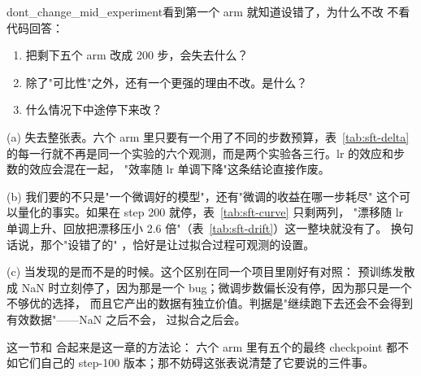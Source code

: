 \begin{checkpoint}{dont_change_mid_experiment}{看到第一个 arm 就知道设错了，为什么不改}
不看代码回答：
\begin{enumerate}[label=(\alph*)]
  \item 把剩下五个 arm 改成 200 步，会失去什么？
  \item 除了"可比性"之外，还有一个更强的理由不改。是什么？
  \item 什么情况下中途停下来改？
\end{enumerate}

\ifshowanswers
\tcblower
\answer (a) 失去整张表。六个 arm 里只要有一个用了不同的步数预算，表~\ref{tab:sft-delta}
的每一行就不再是同一个实验的六个观测，而是两个实验各三行。lr 的效应和步数的效应会混在一起，
"效率随 lr 单调下降"这条结论直接作废。

(b)  我们要的不只是"一个微调好的模型"，还有"微调的收益在哪一步耗尽"
这个可以量化的事实。如果在 step 200 就停，表~\ref{tab:sft-curve} 只剩两列，
"漂移随 lr 单调上升、回放把漂移压小 2.6 倍"（表~\ref{tab:sft-drift}）这一整块就没有了。
换句话说，那个"设错了的" ，恰好是让过拟合过程可观测的设置。

(c) 当发现的是而不是的时候。这个区别在同一个项目里刚好有对照：
预训练发散成 NaN 时立刻停了，因为那是一个 bug；微调步数偏长没有停，因为那只是一个不够优的选择，
而且它产出的数据有独立价值。判据是"继续跑下去还会不会得到有效数据"——NaN 之后不会，
过拟合之后会。
\fi
\end{checkpoint}

这一节和  合起来是这一章的方法论： 六个 arm 里有五个的最终 checkpoint 都不如它们自己的
step-100 版本；那不妨碍这张表说清楚了它要说的三件事。
